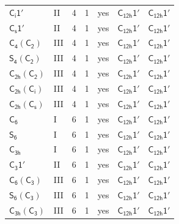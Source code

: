 \documentclass[10pt,a4paper]{article}
\numberwithin{equation}{section}
\newcommand{\grp}[1]{\mathsf{#1}}
\begin{document}
{\begin{longtable}{@{}llrrlll@{}}
\href{S2-1p.pdf}{$\grp{C_{i}1'}$} & II & 4 & 1 & yes & \href{C12h-1p.pdf}{$\grp{C_{12h}1'}$} & \href{C12h-1p.pdf}{$\grp{C_{12h}1'}$}\\
\href{C1v-1p.pdf}{$\grp{C_{s}1'}$} & II & 4 & 1 & yes & \href{C12h-1p.pdf}{$\grp{C_{12h}1'}$} & \href{C12h-1p.pdf}{$\grp{C_{12h}1'}$}\\
\href{C4-C2.pdf}{$\grp{C_{4}}(\grp{C_{2}})$} & III & 4 & 1 & yes & \href{C12h-1p.pdf}{$\grp{C_{12h}1'}$} & \href{C12h-1p.pdf}{$\grp{C_{12h}1'}$}\\
\href{S4-C2.pdf}{$\grp{S_{4}}(\grp{C_{2}})$} & III & 4 & 1 & yes & \href{C12h-1p.pdf}{$\grp{C_{12h}1'}$} & \href{C12h-1p.pdf}{$\grp{C_{12h}1'}$}\\
\href{C2h-C2.pdf}{$\grp{C_{2h}}(\grp{C_{2}})$} & III & 4 & 1 & yes & \href{C12h-1p.pdf}{$\grp{C_{12h}1'}$} & \href{C12h-1p.pdf}{$\grp{C_{12h}1'}$}\\
\href{C2h-S2.pdf}{$\grp{C_{2h}}(\grp{C_{i}})$} & III & 4 & 1 & yes & \href{C12h-1p.pdf}{$\grp{C_{12h}1'}$} & \href{C12h-1p.pdf}{$\grp{C_{12h}1'}$}\\
\href{C2h-C1v.pdf}{$\grp{C_{2h}}(\grp{C_{s}})$} & III & 4 & 1 & yes & \href{C12h-1p.pdf}{$\grp{C_{12h}1'}$} & \href{C12h-1p.pdf}{$\grp{C_{12h}1'}$}\\
\href{../../../rotation/data/pdf/C6.pdf}{$\grp{C_{6}}$} & I & 6 & 1 & yes & \href{C12h-1p.pdf}{$\grp{C_{12h}1'}$} & \href{C12h-1p.pdf}{$\grp{C_{12h}1'}$}\\
\href{../../../rotation/data/pdf/S6.pdf}{$\grp{S_{6}}$} & I & 6 & 1 & yes & \href{C12h-1p.pdf}{$\grp{C_{12h}1'}$} & \href{C12h-1p.pdf}{$\grp{C_{12h}1'}$}\\
\href{../../../rotation/data/pdf/C3h.pdf}{$\grp{C_{3h}}$} & I & 6 & 1 & yes & \href{C12h-1p.pdf}{$\grp{C_{12h}1'}$} & \href{C12h-1p.pdf}{$\grp{C_{12h}1'}$}\\
\href{C3-1p.pdf}{$\grp{C_{3}1'}$} & II & 6 & 1 & yes & \href{C12h-1p.pdf}{$\grp{C_{12h}1'}$} & \href{C12h-1p.pdf}{$\grp{C_{12h}1'}$}\\
\href{C6-C3.pdf}{$\grp{C_{6}}(\grp{C_{3}})$} & III & 6 & 1 & yes & \href{C12h-1p.pdf}{$\grp{C_{12h}1'}$} & \href{C12h-1p.pdf}{$\grp{C_{12h}1'}$}\\
\href{S6-C3.pdf}{$\grp{S_{6}}(\grp{C_{3}})$} & III & 6 & 1 & yes & \href{C12h-1p.pdf}{$\grp{C_{12h}1'}$} & \href{C12h-1p.pdf}{$\grp{C_{12h}1'}$}\\
\href{C3h-C3.pdf}{$\grp{C_{3h}}(\grp{C_{3}})$} & III & 6 & 1 & yes & \href{C12h-1p.pdf}{$\grp{C_{12h}1'}$} & \href{C12h-1p.pdf}{$\grp{C_{12h}1'}$}\\

\end{longtable}}
\end{document}
